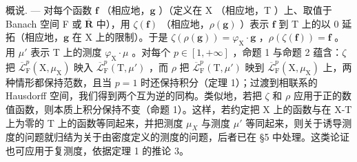 概说. --- 对每个函数 \(\mathbf{f}\) （相应地，\(\mathbf{g}\) ）（定义在 X （相应地，T ）上、取值于 Banach 空间 F 或 \(\overline{\mathbf{R}}\) 中），用 \(\zeta(\mathbf{f})\) （相应地，\(\rho(\mathbf{g})\) ）表示 \(\mathbf{f}\) 到 T 上的以 0 延拓（相应地，\(\mathbf{g}\) 在 X 上的限制）。于是 \(\zeta(\rho(\mathbf{g})) = \varphi_{\mathrm{X}} \cdot \mathbf{g}\) ，\(\rho(\zeta(\mathbf{f})) = \mathbf{f}\) 。用 \(\mu'\) 表示 T 上的测度 \(\varphi_{\mathrm{X}} \cdot \mu\) 。对每个 \(p \in [1, +\infty]\) ，命题 1 与命题 2 蕴含：\(\zeta\) 把 \(\overline{\mathcal{L}}_{\mathrm{F}}^{p}(\mathrm{X}, \mu_{\mathrm{X}})\) 映入 \(\overline{\mathcal{L}}_{\mathrm{F}}^{p}(\mathrm{T}, \mu')\) ，而 \(\rho\) 把 \(\overline{\mathcal{L}}_{\mathrm{F}}^{p}(\mathrm{T}, \mu')\) 映到 \(\overline{\mathcal{L}}_{\mathrm{F}}^{p}(\mathrm{X}, \mu_{\mathrm{X}})\) 上，两种情形都保持范数，且当 \(p = 1\) 时还保持积分（定理 1）；过渡到相联系的 Hausdorff 空间，我们得到两个互为逆的同构。类似地，若把 \(\zeta\) 和 \(\rho\) 应用于正的数值函数，则本质上积分保持不变（命题 1）。这样，若约定把 X 上的函数与在 X-T 上为零的 T 上的函数等同起来，并把测度 \(\mu_{X}\) 与测度 \(\mu'\) 等同起来，则关于诱导测度的问题就归结为关于由密度定义的测度的问题，后者已在 §5 中处理。这类论证也可应用于复测度，依据定理 1 的推论 3。
\relax{}
